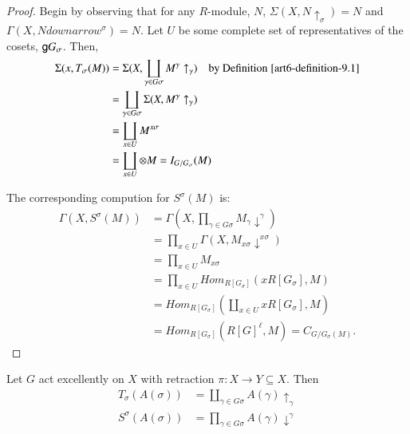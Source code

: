 \begin{proof}
Begin by observing that for any $R$-module, $N$, $\Sigma(X, N\uparrow_{\sigma}) = N$ and $\Gamma (X, N downarrow^{\sigma}) = N$. Let $U$ be some complete set of representatives of the cosets, $\mathsf{g} G_{\sigma}$. Then,
\begin{align*}
\Sigma(x, T_{\sigma}(M)) &= \Sigma(X, \coprod_{\gamma \in G\sigma}M^{\gamma} \uparrow_{\gamma}) \quad \text{by Definition} \;\ref{art6-definition-9.1}\\
&= \coprod_{\gamma \in G\sigma} \Sigma(X, M^{\gamma} \uparrow_{\gamma})\\
& = \coprod_{x \in U} M^{x\sigma}\\
& = \coprod_{x \in U} \otimes M = I_{G/G_{\sigma}}(M)
\end{align*}

The corresponding compution for $S^{\sigma}(M)$ is:
\begin{align*}
\Gamma (X, S^{\sigma}(M)) &= \Gamma(X, \prod_{\gamma \in G\sigma}M_{\gamma}\downarrow^{\gamma})\\
& = \prod_{x \in U} \Gamma(X, M_{x\sigma} \downarrow^{x\sigma})\\
& = \prod_{x \in U} M_{x\sigma}\\
&= \prod_{x \in U}Hom_{R[G_{\sigma}]}(x R[G_{\sigma}], M)\\
& = Hom_{R[G_{\sigma}]}(\coprod_{x \in U} xR[G_{\sigma}], M)\\
& = Hom_{R[G_{\sigma}]}(R[G]^{\ell}, M ) = C_{G/G_{\sigma}(M)}.
\end{align*}
\end{proof}

\begin{prop}\label{art6-proposition-9.7}
Let $G$ act excellently on $X$ with retraction $\pi : X\rightarrow Y \subseteq X$. Then
\begin{align*}
T_{\sigma}(A(\sigma)) &= \coprod_{\gamma \in G\sigma}A(\gamma )\uparrow_{\gamma}\\
S^{\sigma}(A(\sigma)) &= \prod_{\gamma \in G\sigma}A(\gamma)\downarrow^{\gamma}
\end{align*}
\end{prop}

